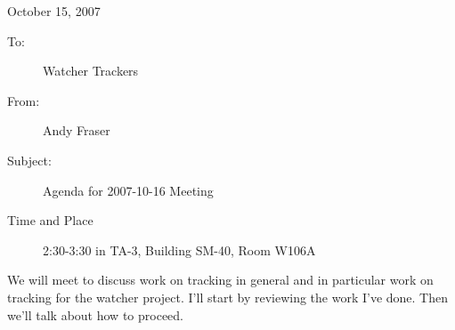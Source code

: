 \documentclass{article}
\begin{document}
\noindent
\hfill October 15, 2007\\
\noindent
\begin{description}
\item[To:] Watcher Trackers
\item[From:] Andy Fraser
\item[Subject:] Agenda for 2007-10-16 Meeting
\item[Time and Place] 2:30-3:30 in TA-3, Building SM-40, Room W106A
\vspace{1cm}
\end{description}

\noindent
We will meet to discuss work on tracking in general and in particular
work on tracking for the watcher project.  I'll start by reviewing the
work I've done.  Then we'll talk about how to proceed.
\end{document}

